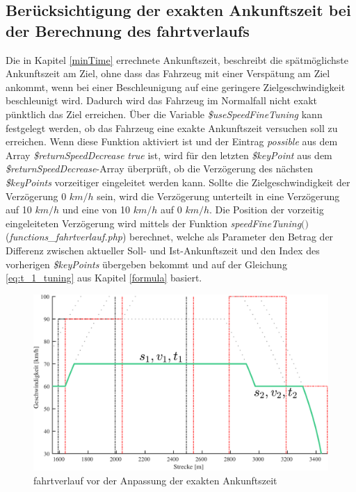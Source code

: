 \subsection{Berücksichtigung der exakten Ankunftszeit bei der Berechnung des \Gls{fahrtverlauf}s} \label{time2}
Die in Kapitel \ref{minTime} errechnete Ankunftszeit, beschreibt die spätmöglichste Ankunftszeit am Ziel, ohne dass das Fahrzeug mit einer Verspätung am Ziel ankommt, wenn bei einer Beschleunigung auf eine geringere Zielgeschwindigkeit beschleunigt wird. Dadurch wird das Fahrzeug im Normalfall nicht exakt pünktlich das Ziel erreichen. Über die Variable \textit{\$useSpeedFineTuning} kann festgelegt werden, ob das Fahrzeug eine exakte Ankunftszeit versuchen soll zu erreichen. Wenn diese Funktion aktiviert ist und der Eintrag \textit{possible} aus dem Array \textit{\$returnSpeedDecrease} \textit{true} ist, wird für den letzten \textit{\$keyPoint} aus dem \textit{\$return\-Speed\-De\-crease}-Array überprüft, ob die Verzögerung des nächsten \textit{\$keyPoints} vorzeitiger eingeleitet werden kann. Sollte die Zielgeschwindigkeit der Verzögerung 0 $km/h$ sein, wird die Verzögerung unterteilt in eine Verzögerung auf 10 $km/h$ und eine von 10 $km/h$ auf 0 $km/h$. Die Position der vorzeitig eingeleiteten Verzögerung wird mittels der Funktion \textit{speedFineTuning$($$)$} (\textit{functions\_fahrtverlauf.php}) berechnet, welche als Parameter den Betrag der Differenz zwischen aktueller Soll- und Ist-Ankunftszeit und den Index des vorherigen \textit{\$keyPoints} übergeben bekommt und auf der Gleichung \ref{eq:t_1_tuning} aus Kapitel \ref{formula} basiert.
\begin{figure}
\includegraphics[width=\linewidth]{../images/matlab/it11.pdf}
\caption{\Gls{fahrtverlauf} vor der Anpassung der exakten Ankunftszeit}
\label{fig:it11}
\end{figure}
